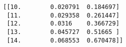 \documentclass[11pt]{article}
\begin{document}
    \begin{Verbatim}[commandchars=\\\{\}]
[[10.        0.020791  0.184697]
 [11.        0.029358  0.261447]
 [12.        0.0316    0.366729]
 [13.        0.045727  0.51665 ]
 [14.        0.068553  0.670478]]
    \end{Verbatim}


    
    
    
\end{document}
